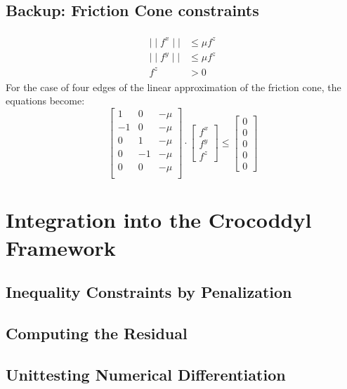 \subsection{Backup: Friction Cone constraints}
\begin{align}
\begin{split}
\mid\mid f^x\mid\mid &\leq \mu f^z \\
\mid\mid f^y\mid\mid &\leq \mu f^z \\
f^z &> 0
\end{split}
\end{align}
For the case of four edges of the linear approximation of the friction cone, the equations become:
\begin{equation}
\begin{bmatrix} 1 & 0 & -\mu \\
-1 & 0 & -\mu \\
0 & 1 & -\mu \\
0 & -1 & -\mu \\
0 & 0 & -\mu \\ \end{bmatrix} \cdot
\begin{bmatrix} f^x \\ f^y \\ f^z \end{bmatrix} \leq
\begin{bmatrix} 0 \\ 0 \\ 0 \\ 0 \\ 0 \end{bmatrix}
\end{equation}

\section{Integration into the Crocoddyl Framework}
\subsection{Inequality Constraints by Penalization}
\subsection{Computing the Residual}
\subsection{Unittesting Numerical Differentiation} 




